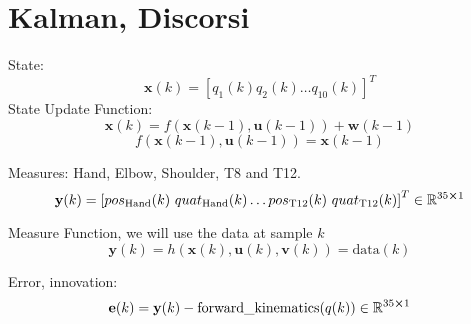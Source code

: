 
\graphicspath{{./figs/}}


\author{Alessia Biondi, Andrea Ferroni e Francesco Petracci} 





 
\section{Kalman, Discorsi}


State: 
\begin{equation}
	\textbf{x}(k) = \left[q_1 (k) q_2 (k) \dots q_{10} (k) \right]^T
\end{equation}
State Update Function:
\begin{equation}
	\textbf{x}(k) = f(\textbf{x}(k-1), \textbf{u}(k-1) ) + \textbf{w}(k-1)
\end{equation}
\begin{equation}
	f(\textbf{x}(k-1), \textbf{u}(k-1) ) = \textbf{x}(k-1)
\end{equation}


Measures:
Hand, Elbow, Shoulder, T8 and T12.
\begin{equation}
\textbf{y}(k) = \left[ 	pos_{\text{Hand}}(k) \ quat_{\text{Hand}}(k) \dots
						pos_{\text{T12}}(k) \ quat_{\text{T12}}(k) 
						 \right]^T \in \mathbb{R}^{35 \cross 1}
\end{equation}

Measure Function, we will use the data at sample $k$
\begin{equation}
	\textbf{y}(k) = h(\textbf{x}(k), \textbf{u}(k), \textbf{v}(k) ) = \text{data}(k)
\end{equation}

Error, innovation:
\begin{equation}
	\textbf{e}(k) = \textbf{y}(k) -  \text{forward\_kinematics}(q(k)) \in \mathbb{R}^{35 \cross 1}
\end{equation}



	
